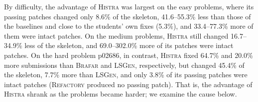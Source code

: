 \documentclass[10pt,conference]{IEEEtran}
\begin{document}
By difficulty, the advantage of \textsc{Histra} was largest on the easy problems, where its passing patches changed only 8.6\% of the skeleton, 41.6--55.3\% less than those of the baselines and close to the students' own fixes (5.3\%), and 33.4--77.3\% more of them were intact patches. On the medium problems, \textsc{Histra} still changed 16.7--34.9\% less of the skeleton, and 69.0--302.0\% more of its patches were intact patches. On the hard problem p02686, in contrast, \textsc{Histra} fixed 64.7\% and 20.0\% more submissions than \textsc{Brafar} and \textsc{LSGen}, respectively, but changed 45.4\% of the skeleton, 7.7\% more than \textsc{LSGen}, and only 3.8\% of its passing patches were intact patches (\textsc{Refactory} produced no passing patch). That is, the advantage of \textsc{Histra} shrank as the problems became harder; we examine the cause below.
\end{document}
